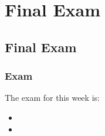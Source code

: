 \clearpage

\renewcommand{\ChapTitle}{Final Exam}
\renewcommand{\SectionTitle}{Final Exam}

\chapter{\ChapTitle}

\section{\SectionTitle}

\subsection{Exam}

The exam for this week is:

\begin{itemize}
    \item {}
    \item {}
\end{itemize}